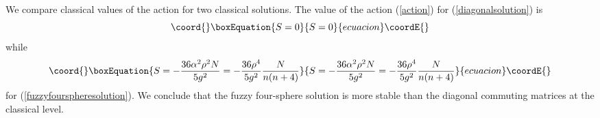 \documentclass[a4paper,11pt]{article}
\begin{document}
We compare classical values of the action for 
two classical solutions. 
The value of the action (\ref{action}) 
for (\ref{diagonalsolution}) is 
\begin{equation}\coord{}\boxEquation{ 
S=0
}{ 
S=0
}{ecuacion}\coordE{}\end{equation} 
while 
\begin{equation}\coord{}\boxEquation{ 
S=-\frac{36\alpha^{2}\rho^{2}N}{5g^{2}}
=-\frac{36\rho^{4}}{5g^{2}}
\frac{N}{n(n+4)}
}{ 
S=-\frac{36\alpha^{2}\rho^{2}N}{5g^{2}}
=-\frac{36\rho^{4}}{5g^{2}}
\frac{N}{n(n+4)}
}{ecuacion}\coordE{}\end{equation} 
for (\ref{fuzzyfourspheresolution}). 
We conclude that 
the fuzzy four-sphere solution is more stable 
than the diagonal commuting matrices at the classical level. 

\vspace{0.5cm} 
\end{document}
